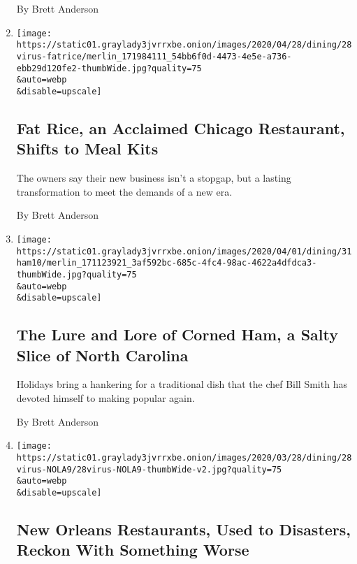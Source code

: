 \begin{enumerate}
  By Brett Anderson
\item
  \href{/2020/04/28/dining/super-fat-rice-mart-chicago-coronavirus.html}{}

  \texttt{[image: https://static01.graylady3jvrrxbe.onion/images/2020/04/28/dining/28virus-fatrice/merlin\_171984111\_54bb6f0d-4473-4e5e-a736-ebb29d120fe2-thumbWide.jpg?quality=75\\\&auto=webp\\\&disable=upscale]}

  \hypertarget{fat-rice-an-acclaimed-chicago-restaurant-shifts-to-meal-kits}{%
  \subsection{Fat Rice, an Acclaimed Chicago Restaurant, Shifts to Meal
  Kits}\label{fat-rice-an-acclaimed-chicago-restaurant-shifts-to-meal-kits}}

  The owners say their new business isn't a stopgap, but a lasting
  transformation to meet the demands of a new era.

  By Brett Anderson
\item
  \href{/2020/04/07/dining/corned-ham.html}{}

  \texttt{[image: https://static01.graylady3jvrrxbe.onion/images/2020/04/01/dining/31ham10/merlin\_171123921\_3af592bc-685c-4fc4-98ac-4622a4dfdca3-thumbWide.jpg?quality=75\\\&auto=webp\\\&disable=upscale]}

  \hypertarget{the-lure-and-lore-of-corned-ham-a-salty-slice-of-north-carolina}{%
  \subsection{The Lure and Lore of Corned Ham, a Salty Slice of North
  Carolina}\label{the-lure-and-lore-of-corned-ham-a-salty-slice-of-north-carolina}}

  Holidays bring a hankering for a traditional dish that the chef Bill
  Smith has devoted himself to making popular again.

  By Brett Anderson
\item
  \href{/2020/03/28/dining/new-orleans-restaurants-coronavirus.html}{}

  \texttt{[image: https://static01.graylady3jvrrxbe.onion/images/2020/03/28/dining/28virus-NOLA9/28virus-NOLA9-thumbWide-v2.jpg?quality=75\\\&auto=webp\\\&disable=upscale]}

  \hypertarget{new-orleans-restaurants-used-to-disasters-reckon-with-something-worse}{%
  \subsection{New Orleans Restaurants, Used to Disasters, Reckon With
  Something
  Worse}\label{new-orleans-restaurants-used-to-disasters-reckon-with-something-worse}}


\end{enumerate}
